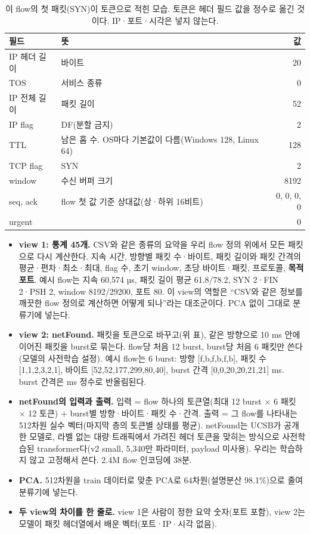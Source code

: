 \begin{table}[H]
\centering\small
\caption{이 flow의 첫 패킷(SYN)이 토큰으로 적힌 모습. 토큰은 헤더 필드 값을 정수로 옮긴 것이다. IP·포트·시각은 넣지 않는다.}
\begin{tabular}{llr}
\toprule 필드 & 뜻 & 값\\\midrule
IP 헤더 길이 & 바이트 & 20\\
TOS & 서비스 종류 & 0\\
IP 전체 길이 & 패킷 길이 & 52\\
IP flag & DF(분할 금지) & 2\\
TTL & 남은 홉 수. OS마다 기본값이 다름(Windows 128, Linux 64) & 128\\
TCP flag & SYN & 2\\
window & 수신 버퍼 크기 & 8192\\
seq, ack & flow 첫 값 기준 상대값(상·하위 16비트) & 0, 0, 0, 0\\
urgent & & 0\\
\bottomrule
\end{tabular}
\end{table}

\begin{itemize}
\item \textbf{view 1: 통계 45개.} CSV와 같은 종류의 요약을 우리 flow 정의 위에서 모든 패킷으로 다시 계산한다. 지속 시간, 방향별 패킷 수·바이트, 패킷 길이와 패킷 간격의 평균·편차·최소·최대, flag 수, 초기 window, 초당 바이트·패킷, 프로토콜, \textbf{목적 포트}. 예시 flow는 지속 60,574 µs, 패킷 길이 평균 61.8/78.2, SYN 2·FIN 2·PSH 2, window 8192/29200, 포트 80. 이 view의 역할은 ``CSV와 같은 정보를 깨끗한 flow 정의로 계산하면 어떻게 되나''라는 대조군이다. PCA 없이 그대로 분류기에 넣는다.
\item \textbf{view 2: netFound.} 패킷을 토큰으로 바꾸고(위 표), 같은 방향으로 10 ms 안에 이어진 패킷을 burst로 묶는다. flow당 처음 12 burst, burst당 처음 6 패킷만 쓴다(모델의 사전학습 설정). 예시 flow는 6 burst: 방향 [f,b,f,b,f,b], 패킷 수 [1,1,2,3,2,1], 바이트 [52,52,177,299,80,40], burst 간격 [0,0,20,20,21,21] ms. burst 간격은 ms 정수로 반올림된다.
\item \textbf{netFound의 입력과 출력.} 입력 = flow 하나의 토큰열(최대 12 burst $\times$ 6 패킷 $\times$ 12 토큰) + burst별 방향·바이트·패킷 수·간격. 출력 = 그 flow를 나타내는 512차원 실수 벡터(마지막 층의 토큰별 상태를 평균). netFound는 UCSB가 공개한 모델로, 라벨 없는 대량 트래픽에서 가려진 헤더 토큰을 맞히는 방식으로 사전학습된 transformer다(v2 small, 5,340만 파라미터, payload 미사용). 우리는 학습하지 않고 고정해서 쓴다. 2.4M flow 인코딩에 38분.
\item \textbf{PCA.} 512차원을 train 데이터로 맞춘 PCA로 64차원(설명분산 98.1\%)으로 줄여 분류기에 넣는다.
\item \textbf{두 view의 차이를 한 줄로.} view 1은 사람이 정한 요약 숫자(포트 포함), view 2는 모델이 패킷 헤더열에서 배운 벡터(포트·IP·시각 없음).
\end{itemize}

